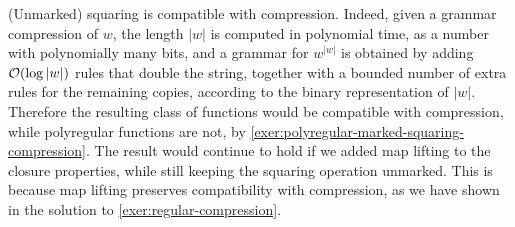  {
(Unmarked) squaring is compatible with compression. Indeed, given a grammar compression of $w$, the length $|w|$ is computed in polynomial time, as a number with polynomially many bits, and a grammar for $w^{|w|}$ is obtained by adding ${\mathcal O}(\log |w|)$ rules that double the string, together with a bounded number of extra rules for the remaining copies, according to the binary representation of $|w|$. Therefore the resulting class of functions would be compatible with compression, while polyregular functions are not, by \cref{exer:polyregular-marked-squaring-compression}. The result would continue to hold if we added map lifting to the closure properties, while still keeping the squaring operation unmarked. This is because map lifting preserves compatibility with compression, as we have shown in the solution to \cref{exer:regular-compression}.
}